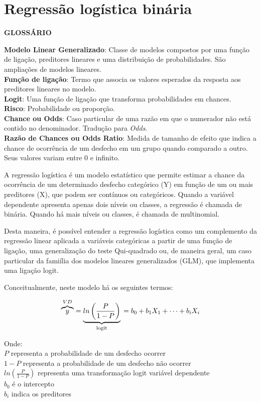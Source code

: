 \documentclass[
]{book}
\begin{document}
\hypertarget{regressuxe3o-loguxedstica-binuxe1ria}{%
\chapter{Regressão logística
binária}\label{regressuxe3o-loguxedstica-binuxe1ria}}

\begin{writing}
\textbf{GLOSSÁRIO}

\textbf{Modelo Linear Generalizado}: Classe de modelos compostos por uma
função de ligação, preditores lineares e uma distribuição de
probabilidades. São ampliações de modelos lineares.\\
\textbf{Função de ligação}: Termo que associa os valores esperados da
resposta aos preditores lineares no modelo.\\
\textbf{Logit}: Uma função de ligação que transforma probabilidades em
chances.\\
\textbf{Risco}: Probabilidade ou proporção.\\
\textbf{Chance ou Odds}: Caso particular de uma razão em que o numerador
não está contido no denominador. Tradução para \emph{Odds}.\\
\textbf{Razão de Chances ou Odds Ratio}: Medida de tamanho de efeito que
indica a chance de ocorrência de um desfecho em um grupo quando
comparado a outro. Seus valores variam entre 0 e infinito.
\end{writing}

A regressão logística é um modelo estatístico que permite estimar a
chance da ocorrência de um determinado desfecho categórico (Y) em função
de um ou mais preditores (X), que podem ser contínuos ou categóricos.
Quando a variável dependente apresenta apenas dois níveis ou classes, a
regressão é chamada de binária. Quando há mais níveis ou classes, é
chamada de multinomial.

Desta maneira, é possível entender a regressão logística como um
complemento da regressão linear aplicada a variáveis categóricas a
partir de uma função de ligação, uma generalização do teste Qui-quadrado
ou, de maneira geral, um caso particular da famiília dos modelos
lineares generalizados (GLM), que implementa uma ligação logit.

Conceitualmente, neste modelo há os seguintes termos:

\[\overbrace{y}^{VD} = \underbrace{ln\left ( \frac{P}{1-P} \right)}_\text{logit} \\= b_0+b_1X_1+ \dots + b_iX_i\]

Onde:\\
\(P\) representa a probabilidade de um desfecho ocorrer\\
\(1-P\) representa a probabilidade de um desfecho não ocorrer\\
\(ln\left ( \frac{P}{1-P} \right)\) representa uma transformação logit
variável dependente\\
\(b_0\) é o intercepto\\
\(b_i\) indica os preditores
\end{document}
